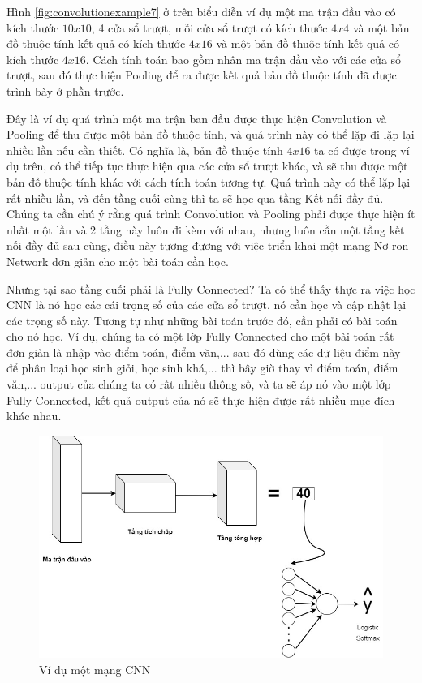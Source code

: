 Hình \ref{fig:convolutionexample7} ở trên biểu diễn ví dụ một ma trận đầu vào có kích thước $10x10$, 4 cửa sổ trượt, mỗi cửa sổ trượt có kích thước $4x4$ và một bản đồ thuộc tính kết quả có kích thước $4x16$ và một bản đồ thuộc tính kết quả có kích thước $4x16$. Cách tính toán bao gồm nhân ma trận đầu vào với các cửa sổ trượt, sau đó thực hiện Pooling để ra được kết quả bản đồ thuộc tính đã được trình bày ở phần trước.

Đây là ví dụ quá trình một ma trận ban đầu được thực hiện Convolution và Pooling để thu được một bản đồ thuộc tính, và quá trình này có thể lặp đi lặp lại nhiều lần nếu cần thiết. Có nghĩa là, bản đồ thuộc tính $4x16$ ta có được trong ví dụ trên, có thể tiếp tục thực hiện qua các cửa sổ trượt khác, và sẽ thu được một bản đồ thuộc tính khác với cách tính toán tương tự. Quá trình này có thể lặp lại rất nhiều lần, và đến tầng cuối cùng thì ta sẽ học qua tầng Kết nối đầy đủ. Chúng ta cần chú ý rằng quá trình Convolution và Pooling phải được thực hiện ít nhất một lần và 2 tầng này luôn đi kèm với nhau, nhưng luôn cần một tầng kết nối đầy đủ sau cùng, điều này tương đương với việc triển khai một mạng Nơ-ron Network đơn giản cho một bài toán cần học.

Nhưng tại sao tầng cuối phải là Fully Connected? Ta có thể thấy thực ra việc học CNN là nó học các cái trọng số của các cửa sổ trượt, nó cần học và cập nhật lại các trọng số này. Tương tự như những bài toán trước đó, cần phải có bài toán cho nó học. Ví dụ, chúng ta có một lớp Fully Connected cho một bài toán rất đơn giản là nhập vào điểm toán, điểm văn,... sau đó dùng các dữ liệu điểm này để phân loại học sinh giỏi, học sinh khá,... thì bây giờ thay vì điểm toán, điểm văn,... output của chúng ta có rất nhiều thông số, và ta sẽ áp nó vào một lớp Fully Connected, kết quả output của nó sẽ thực hiện được rất nhiều mục đích khác nhau.

\begin{figure}[!h]
	\centering
		\includegraphics[width=1\columnwidth]{chapter05/figure/convolution-example-5.jpg}
        \caption{Ví dụ một mạng CNN}
        \label{fig:convolutionexample5}
\end{figure}

